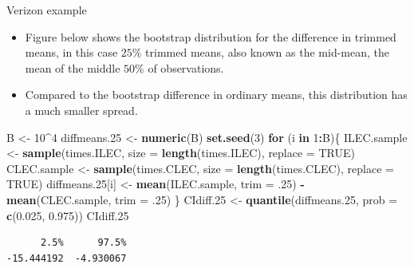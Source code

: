 \documentclass[
  ignorenonframetext,
]{beamer}
\newenvironment{Shaded}{\begin{snugshade}}{\end{snugshade}}
\newcommand{\AttributeTok}[1]{\textcolor[rgb]{0.13,0.29,0.53}{#1}}
\newcommand{\ConstantTok}[1]{\textcolor[rgb]{0.56,0.35,0.01}{#1}}
\newcommand{\ControlFlowTok}[1]{\textcolor[rgb]{0.13,0.29,0.53}{\textbf{#1}}}
\newcommand{\DecValTok}[1]{\textcolor[rgb]{0.00,0.00,0.81}{#1}}
\newcommand{\FloatTok}[1]{\textcolor[rgb]{0.00,0.00,0.81}{#1}}
\newcommand{\FunctionTok}[1]{\textcolor[rgb]{0.13,0.29,0.53}{\textbf{#1}}}
\newcommand{\NormalTok}[1]{#1}
\newcommand{\OtherTok}[1]{\textcolor[rgb]{0.56,0.35,0.01}{#1}}
\newcommand{\SpecialCharTok}[1]{\textcolor[rgb]{0.81,0.36,0.00}{\textbf{#1}}}
\begin{document}
\begin{frame}[fragile]{Verizon example}
\label{verizon-example-9}
\begin{itemize}
\item
  Figure below shows the bootstrap distribution for the difference in
  trimmed means, in this case \(25\%\) trimmed means, also known as the
  mid-mean, the mean of the middle \(50\%\) of observations.
\item
  Compared to the bootstrap difference in ordinary means, this
  distribution has a much smaller spread.
\end{itemize}

\tiny

\begin{Shaded}
\begin{Highlighting}[]
\NormalTok{B }\OtherTok{\textless{}{-}} \DecValTok{10}\SpecialCharTok{\^{}}\DecValTok{4}
\NormalTok{diffmeans}\FloatTok{.25} \OtherTok{\textless{}{-}} \FunctionTok{numeric}\NormalTok{(B)}
\FunctionTok{set.seed}\NormalTok{(}\DecValTok{3}\NormalTok{)}
\ControlFlowTok{for}\NormalTok{ (i }\ControlFlowTok{in} \DecValTok{1}\SpecialCharTok{:}\NormalTok{B)\{}
\NormalTok{  ILEC.sample }\OtherTok{\textless{}{-}} \FunctionTok{sample}\NormalTok{(times.ILEC, }\AttributeTok{size =} \FunctionTok{length}\NormalTok{(times.ILEC), }\AttributeTok{replace =} \ConstantTok{TRUE}\NormalTok{)}
\NormalTok{  CLEC.sample }\OtherTok{\textless{}{-}} \FunctionTok{sample}\NormalTok{(times.CLEC, }\AttributeTok{size =} \FunctionTok{length}\NormalTok{(times.CLEC), }\AttributeTok{replace =} \ConstantTok{TRUE}\NormalTok{)}
\NormalTok{  diffmeans}\FloatTok{.25}\NormalTok{[i] }\OtherTok{\textless{}{-}} \FunctionTok{mean}\NormalTok{(ILEC.sample, }\AttributeTok{trim =}\NormalTok{ .}\DecValTok{25}\NormalTok{) }\SpecialCharTok{{-}} \FunctionTok{mean}\NormalTok{(CLEC.sample, }\AttributeTok{trim =}\NormalTok{ .}\DecValTok{25}\NormalTok{)}
\NormalTok{\}}
\NormalTok{CIdiff}\FloatTok{.25} \OtherTok{\textless{}{-}} \FunctionTok{quantile}\NormalTok{(diffmeans}\FloatTok{.25}\NormalTok{, }\AttributeTok{prob =} \FunctionTok{c}\NormalTok{(}\FloatTok{0.025}\NormalTok{, }\FloatTok{0.975}\NormalTok{))}
\NormalTok{CIdiff}\FloatTok{.25}
\end{Highlighting}
\end{Shaded}

\begin{verbatim}
      2.5%      97.5% 
-15.444192  -4.930067 
\end{verbatim}

\normalsize
\end{frame}
\end{document}
